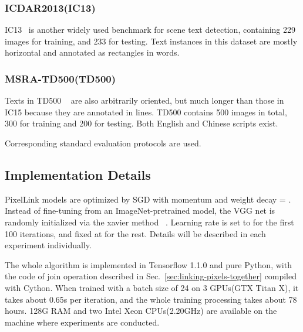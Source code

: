 \documentclass[letterpaper]{article} \usepackage{aaai18}  \usepackage{times}  \usepackage{helvet}  \usepackage{courier}  \usepackage{url}  \usepackage{graphicx}
\begin{document}
	\subsubsection{ICDAR2013(IC13)}
	IC13~\cite{Karatzas2013ICDAR} is another widely used benchmark for scene text detection, containing 229 images for training, and 233 for testing. Text instances in this dataset are mostly horizontal and annotated as rectangles in words.
	
	\subsubsection{MSRA-TD500(TD500)}
	Texts in TD500 ~\cite{Yao2012TD500} are also arbitrarily oriented, but much longer than those in IC15 because they are annotated in lines. TD500 contains 500 images in total, 300 for training and 200 for testing. Both English and Chinese scripts exist.
	
	
	Corresponding standard evaluation protocols are used.
	\subsection{Implementation Details}
	PixelLink models are optimized by SGD with momentum  and weight decay = . Instead of fine-tuning from an ImageNet-pretrained model, the VGG net is randomly initialized via the xavier method ~\cite{Glorot2010Xavier}. Learning rate is set to  for the first 100 iterations, and fixed at  for the rest. Details will be described in each experiment individually.
	
	The whole algorithm is implemented in Tensorflow 1.1.0 and pure Python, with the code of join operation described in Sec.~\ref{sec:linking-pixels-together} compiled with Cython. When trained with a batch size of 24 on 3 GPUs(GTX Titan X), it takes about 0.65s per iteration, and the whole training processing takes about 78 hours. 128G RAM and two Intel Xeon CPUs(2.20GHz) are available on the machine where experiments are conducted.
	
	
\end{document}

